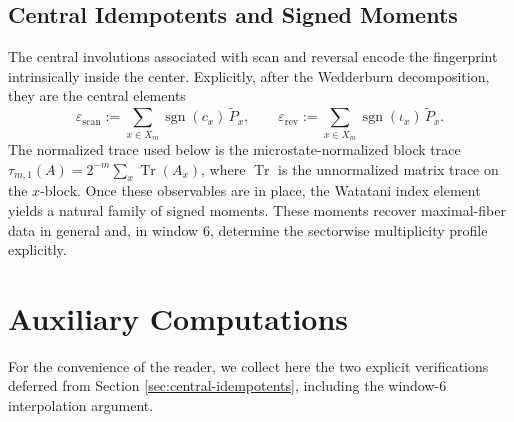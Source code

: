 \documentclass[12pt,a4paper]{article}
\theoremstyle{plain}
\theoremstyle{definition}
\numberwithin{equation}{section}
\DeclareMathOperator{\Tr}{Tr}
\begin{document}
\subsection{Central Idempotents and Signed Moments}
The central involutions associated with scan and reversal encode the fingerprint intrinsically inside the center. Explicitly, after the Wedderburn decomposition, they are the central elements
\[
\varepsilon_{\mathrm{scan}}:=\sum_{x\in X_m}\operatorname{sgn}(c_x)\,\widetilde P_x,
\qquad
\varepsilon_{\mathrm{rev}}:=\sum_{x\in X_m}\operatorname{sgn}(\iota_x)\,\widetilde P_x.
\]
The normalized trace used below is the microstate-normalized block trace \(\tau_{m,1}(A)=2^{-m}\sum_x\Tr(A_x)\), where \(\Tr\) is the unnormalized matrix trace on the \(x\)-block. Once these observables are in place, the Watatani index element yields a natural family of signed moments. These moments recover maximal-fiber data in general and, in window \(6\), determine the sectorwise multiplicity profile explicitly.



\section{Auxiliary Computations}\label{app:window6}
For the convenience of the reader, we collect here the two explicit verifications deferred from Section \ref{sec:central-idempotents}, including the window-\(6\) interpolation argument.
\end{document}
